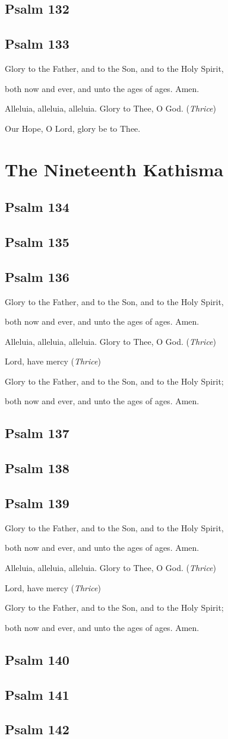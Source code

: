 \documentclass[12pt,openany]{book}
\newcommand{\kathismabreak}{
  \medskip
  \begin{center}
  \begin{footnotesize}
  Glory to the Father, and to the Son, and to the Holy Spirit,
  
  both now and ever, and unto the ages of ages. Amen.

  Alleluia, alleluia, alleluia. Glory to Thee, O God. (\textit{Thrice})

  Lord, have mercy (\textit{Thrice})

  Glory to the Father, and to the Son, and to the Holy Spirit;
  
  both now and ever, and unto the ages of ages. Amen.
  \end{footnotesize}
  \end{center}
  \smallbreak
}
\newcommand{\kathismaend}{
  \medskip
  \begin{center}
  \begin{footnotesize}
  Glory to the Father, and to the Son, and to the Holy Spirit,
  
  both now and ever, and unto the ages of ages. Amen.

  Alleluia, alleluia, alleluia. Glory to Thee, O God. (\textit{Thrice})

  Our Hope, O Lord, glory be to Thee.
  \end{footnotesize}
  \end{center}
  \smallbreak
}
\begin{document}
\section{Psalm 132}

\smallskip
\section{Psalm 133}


\kathismaend

\chapter*{The Nineteenth Kathisma}
\smallskip
\section{Psalm 134}

\smallskip
\section{Psalm 135}

\smallskip
\section{Psalm 136}


\kathismabreak
\smallskip
\section{Psalm 137}

\smallskip
\section{Psalm 138}

\smallskip
\section{Psalm 139}


\kathismabreak
\smallskip
\section{Psalm 140}

\smallskip
\section{Psalm 141}

\smallskip
\section{Psalm 142}

\end{document}
